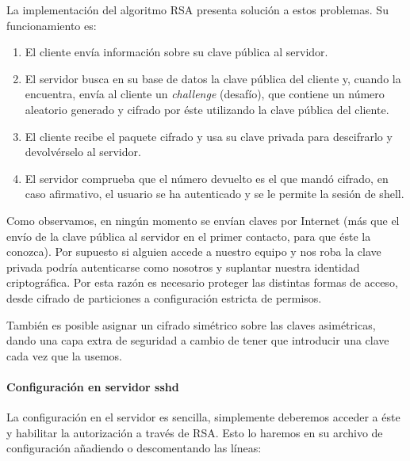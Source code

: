 \documentclass[a4paper, 11pt, titlepage]{book}
\begin{document}
                La implementación del algoritmo RSA presenta solución a estos problemas. Su funcionamiento
                es:
    
                \begin{enumerate}
                    \item El cliente envía información sobre su clave pública al servidor.
                    \item El servidor busca en su base de datos la clave pública del cliente y, cuando la encuentra,
                    envía al cliente un \textit{challenge} (desafío), que contiene un número aleatorio generado y 
                    cifrado por éste utilizando la clave pública del cliente.
                    \item El cliente recibe el paquete cifrado y usa su clave privada para descifrarlo y devolvérselo 
                    al servidor.
                    \item El servidor comprueba que el número devuelto es el que mandó cifrado, en caso afirmativo, el 
                    usuario se ha autenticado y se le permite la sesión de shell.
                \end{enumerate}
    
                Como observamos, en ningún momento se envían claves por Internet (más que el envío 
                de la clave pública al servidor en el primer contacto, para que éste la conozca). Por 
                supuesto si alguien accede a nuestro equipo y nos roba la clave privada podría autenticarse 
                como nosotros y suplantar nuestra identidad criptográfica. Por esta razón es necesario 
                proteger las distintas formas de acceso, desde cifrado de particiones a configuración 
                estricta de permisos. 
                
                También es posible asignar un cifrado simétrico sobre las claves asimétricas, dando una 
                capa extra de seguridad a cambio de tener que introducir una clave cada vez que la usemos.
                
                \paragraph{Configuración en servidor sshd} La configuración en el servidor es sencilla,
                simplemente deberemos acceder a éste y habilitar la autorización a través de RSA. Esto lo haremos 
                en su archivo de configuración añadiendo o descomentando las líneas:
    
\end{document}
